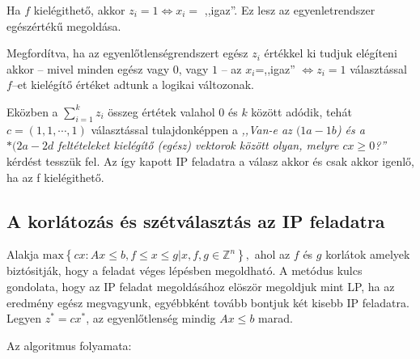 Ha $f$ kielégithető, akkor $z_i=1 \Leftrightarrow x_i=$ ,,igaz''. Ez lesz az
egyenletrendszer egészértékű megoldása. 

Megfordítva, ha az egyenlőtlenségrendszert egész $z_i$ értékkel ki tudjuk
elégíteni akkor -- mivel minden egész vagy $0$, vagy $1$ -- az $x_i$=,,igaz''
$\Leftrightarrow z_i=1$ választással $f$--et kielégítő értéket adtunk a logikai
változonak.

Eközben a $\sum_{i=1}^{k}{z_i}$ összeg értétek valahol $0$ és $k$ között adódik,
tehát $c=(1,1,\cdots,1)$ választással tulajdonképpen a \emph{,,Van-e az
$(1a-1b$) és a $*(2a-2d$ feltételeket kielégítő (egész) vektorok között olyan,
melyre $cx \geq 0$?''} kérdést tesszük fel. Az így kapott IP feladatra a válasz
akkor és csak akkor igenlő, ha az f kielégithető.

\subsection{A korlátozás és szétválasztás az IP feladatra}

Alakja $\mbox{max} \left\{cx:Ax \leq b, f \leq x \leq g| x,f,g \in \mathbb{Z}^n
\right\},$ ahol az $f$ és $g$ korlátok amelyek biztósitják, hogy a feladat véges
lépésben megoldható. A metódus kulcs gondolata, hogy az IP feladat megoldásához elöször
megoldjuk mint LP, ha az eredmény egész megvagyunk, egyébbként tovább bontjuk két kisebb
IP feladatra. Legyen $z^*=cx^*$, az egyenlőtlenség mindig $Ax \leq b$ marad.

Az algoritmus folyamata:

